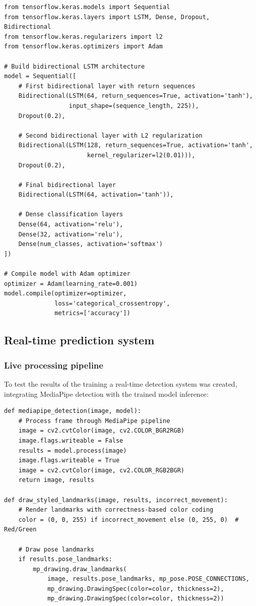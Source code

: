 \begin{verbatim}
from tensorflow.keras.models import Sequential
from tensorflow.keras.layers import LSTM, Dense, Dropout, Bidirectional
from tensorflow.keras.regularizers import l2
from tensorflow.keras.optimizers import Adam

# Build bidirectional LSTM architecture
model = Sequential([
    # First bidirectional layer with return sequences
    Bidirectional(LSTM(64, return_sequences=True, activation='tanh'), 
                  input_shape=(sequence_length, 225)),
    Dropout(0.2),
    
    # Second bidirectional layer with L2 regularization
    Bidirectional(LSTM(128, return_sequences=True, activation='tanh', 
                       kernel_regularizer=l2(0.01))),
    Dropout(0.2),
    
    # Final bidirectional layer
    Bidirectional(LSTM(64, activation='tanh')),
    
    # Dense classification layers
    Dense(64, activation='relu'),
    Dense(32, activation='relu'),
    Dense(num_classes, activation='softmax')
])

# Compile model with Adam optimizer
optimizer = Adam(learning_rate=0.001)
model.compile(optimizer=optimizer, 
              loss='categorical_crossentropy', 
              metrics=['accuracy'])
\end{verbatim}

\subsection{Real-time prediction system}

\subsubsection{Live processing pipeline}

To test the results of the training a real-time detection system was created, integrating MediaPipe detection with the trained model inference:

\begin{verbatim}
def mediapipe_detection(image, model):
    # Process frame through MediaPipe pipeline
    image = cv2.cvtColor(image, cv2.COLOR_BGR2RGB)
    image.flags.writeable = False
    results = model.process(image)
    image.flags.writeable = True
    image = cv2.cvtColor(image, cv2.COLOR_RGB2BGR)
    return image, results

def draw_styled_landmarks(image, results, incorrect_movement):
    # Render landmarks with correctness-based color coding
    color = (0, 0, 255) if incorrect_movement else (0, 255, 0)  # Red/Green
    
    # Draw pose landmarks
    if results.pose_landmarks:
        mp_drawing.draw_landmarks(
            image, results.pose_landmarks, mp_pose.POSE_CONNECTIONS,
            mp_drawing.DrawingSpec(color=color, thickness=2),
            mp_drawing.DrawingSpec(color=color, thickness=2))
\end{verbatim}

